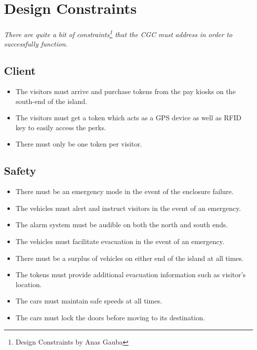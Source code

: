 \documentclass[12pt]{article}
\begin{document}
\section{Design Constraints} \label{cons} %
\paragraph{} \textit{There are quite a bit of constraints\footnote{Design Constraints by Anas Gauba} that the CGC must address in order to successfully function.}

	\subsection{Client}
	\begin{itemize}
		\item The visitors must arrive and purchase tokens from the pay kiosks on the south-end of the island. 
        \item The visitors must get a token which acts as a GPS device as well as RFID key to easily access the perks. 
        \item There must only be one token per visitor.
	\end{itemize}

	\subsection{Safety}
	\begin{itemize}
		\item There must be an emergency mode in the event of the enclosure failure.
		\item The vehicles must alert and instruct visitors in the event of an emergency.
		\item The alarm system must be audible on both the north and south ends.
		\item The vehicles must facilitate evacuation in the event of an emergency.
		\item There must be a surplus of vehicles on either end of the island at all times.
		\item The tokens must provide additional evacuation information such as visitor's location.
		\item The cars must maintain safe speeds at all times.
		\item The cars must lock the doors before moving to its destination.
	\end{itemize}
\end{document}
